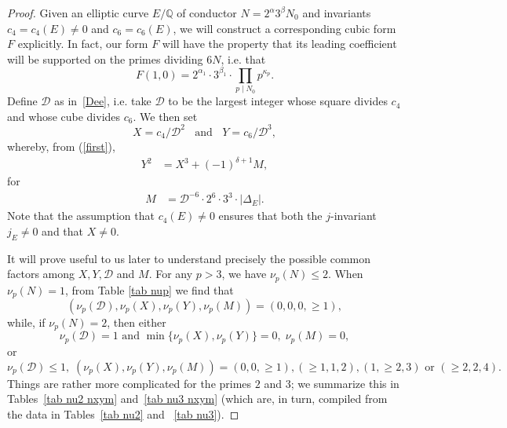 \begin{proof}
Given an elliptic curve $E/\mathbb{Q}$ of conductor $N=2^\alpha 3^\beta N_0$ and invariants $c_4= c_4(E) \neq 0$ and 
$c_6=c_6(E)$, we will construct a corresponding cubic form $F$ explicitly. In fact, our form $F$ will have the property that its leading coefficient will be supported on the primes dividing $6N$, i.e. that
$$
F(1,0) = 2^{\alpha_1} \cdot 3^{\beta_1} \cdot \prod_{p \mid N_0} p^{\kappa_p}.
$$
Define $\mathcal{D}$ as in~\eqref{Dee}, i.e. take 
$\mathcal{D}$ to be the largest integer whose square divides $c_4$ and whose cube divides $c_6$. We then set 
$$
X = c_4/\mathcal{D}^2 \; \; \mbox{ and } \; \; Y = c_6/\mathcal{D}^3,
$$
whereby, from (\ref{first}),
\begin{align} \label{first2}
Y^2 &= X^3 + (-1)^{\delta +1}  M,
\end{align}
for
\begin{align*}
M &=\mathcal{D}^{-6} \cdot 2^6 \cdot 3^3 \cdot |\Delta_E|.
\end{align*}
Note that the assumption that $c_4(E) \neq 0$ ensures that both the $j$-invariant $j_E \neq 0$ and that $X \neq 0$.

It will prove useful to us later to understand precisely the possible common factors among $X, Y, \mathcal{D}$ and $M$.
For any $p>3$, we have $\nu_p(N) \leq 2$. When 
$\nu_p(N)=1$, from Table \ref{tab nup} we find that
\begin{equation} \label{super-1}
( \nu_p (\mathcal{D}), \nu_p (X), \nu_p (Y), \nu_p (M)) = (0,0,0, \geq 1),
\end{equation}
while, if $\nu_p (N)=2$, then either 
\begin{equation} \label{super0}
\nu_p (\mathcal{D}) = 1 \mbox{ and }  \min \{ \nu_p (X), \nu_p (Y) \} = 0, \; \nu_p (M)=0 ,
\end{equation}
or
%
\begin{equation} \label{super}
\nu_p (\mathcal{D}) \leq 1, \;
(\nu_p (X), \nu_p (Y), \nu_p (M) ) = (0,0, \geq 1), (\geq 1, 1, 2), (1, \geq 2, 3) 
\mbox{ or } (\geq 2, 2, 4).
\end{equation}
Things are rather more complicated for the primes $2$ and $3$; we summarize this in Tables~\ref{tab nu2 nxym} and~\ref{tab nu3 
nxym} (which are, in turn, compiled from the data in Tables~\ref{tab nu2} and ~\ref{tab nu3}). 


\end{proof}

